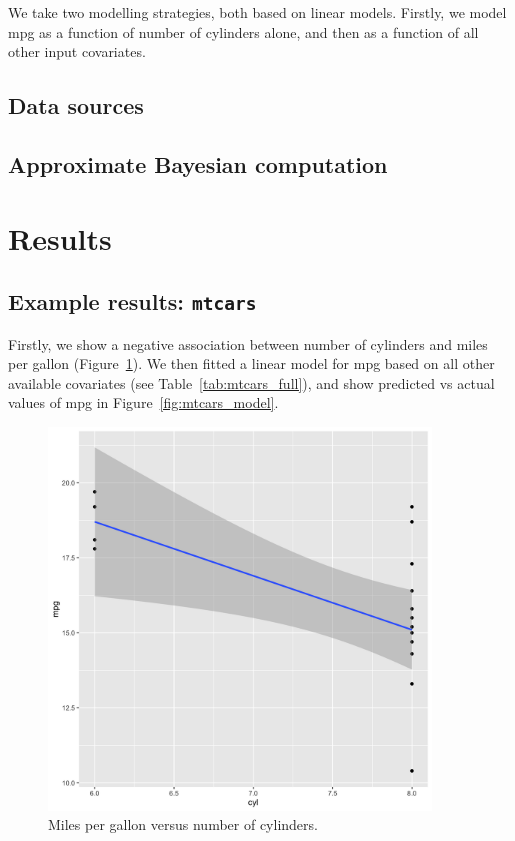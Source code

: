 \documentclass[12pt]{article}
\begin{document}


We take two modelling strategies, both based on linear models. Firstly, we model mpg as a function of number of cylinders alone, and then as a function of all other input covariates.

\subsection{Data sources}
\subsection{Approximate Bayesian computation}

\section{Results}
\subsection{Example results: \texttt{mtcars}}
Firstly, we show a negative association between number of cylinders and miles per gallon (Figure~\ref{fig:mt_cars_summary}). We then fitted a linear model for mpg based on all other available covariates (see Table~\ref{tab:mtcars_full}), and show predicted vs actual values of mpg in Figure~\ref{fig:mtcars_model}.
\begin{figure}[htbp]
    \centering
    \includegraphics[width=4in]{figures/mt_cars_summary.png}
    \caption{Miles per gallon versus number of cylinders.}
    \label{fig:mt_cars_summary}
\end{figure}
\end{document}
